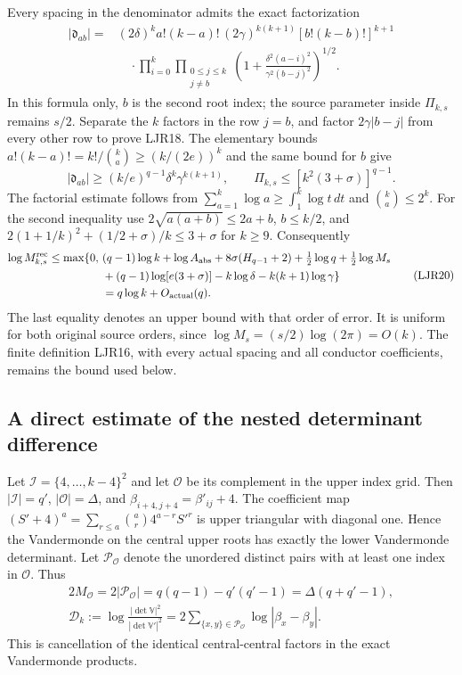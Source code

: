 \documentclass[11pt,a4paper]{article}
\begin{document}
Every spacing in the denominator admits the exact factorization
\[
 \begin{split}
 |\mathfrak d_{ab}|={}&
 (2\delta)^k a!(k-a)!\,
 (2\gamma)^{k(k+1)}[b!(k-b)!]^{k+1}\\
 &\quad\cdot
 \prod_{i=0}^k\prod_{\substack{0\le j\le k\\j\ne b}}
 \left(1+\frac{\delta^2(a-i)^2}{\gamma^2(b-j)^2}\right)^{1/2}.
 \end{split}\tag{LJR18}
\]
In this formula only, $b$ is the second root index; the source
parameter inside $\Pi_{k,s}$ remains $s/2$.
Separate the $k$ factors in the row $j=b$, and factor
$2\gamma|b-j|$ from every other row to prove LJR18.
The elementary bounds
$a!(k-a)!=k!/\binom ka\ge(k/(2e))^k$ and the same bound
for $b$ give
\[
 |\mathfrak d_{ab}|\ge(k/e)^{q-1}
                   \delta^k\gamma^{k(k+1)},\qquad
 \Pi_{k,s}\le[k^2(3+\sigma)]^{q-1}.
 \tag{LJR19}
\]
The factorial estimate follows from
$\sum_{a=1}^k\log a\ge\int_1^k\log t\,dt$ and
$\binom ka\le2^k$.
For the second inequality use
$2\sqrt{a(a+b)}\le2a+b$,
$b\le k/2$, and
$2(1+1/k)^2+(1/2+\sigma)/k\le3+\sigma$ for $k\ge9$.
Consequently
\[
 \begin{split}
 \log M_{k,s}^{\rm rec}\le
 \max\{0,\ &(q-1)\log k+\log A_{\rm abs}
 +8\sigma(H_{q-1}+2)+\tfrac12\log q+\tfrac12\log M_s\\
 &+(q-1)\log[e(3+\sigma)]-k\log\delta
                              -k(k+1)\log\gamma\}\\
 &=q\log k+O_{\rm actual}(q).
 \end{split}\tag{LJR20}
\]
The last equality denotes an upper bound with that order of
error. It is uniform for both original source orders, since
$\log M_s=(s/2)\log(2\pi)=O(k)$.
The finite definition LJR16, with every actual spacing and
all conductor coefficients, remains the bound used below.

\subsection{A direct estimate of the nested determinant difference}

Let $\mathcal I=\{4,\ldots,k-4\}^2$ and let $\mathcal O$ be
its complement in the upper index grid. Then
$|\mathcal I|=q'$, $|\mathcal O|=\Delta$, and
$\beta_{i+4,j+4}=\beta'_{ij}+4$.
The coefficient map
$(S'+4)^a=\sum_{r\le a}\binom ar4^{a-r}S'^r$
is upper triangular with diagonal one. Hence the Vandermonde
on the central upper roots has exactly the lower Vandermonde
determinant. Let $\mathcal P_{\mathcal O}$ denote the unordered
distinct pairs with at least one index in $\mathcal O$. Thus
\[
 \begin{gathered}
 2M_{\mathcal O}=2|\mathcal P_{\mathcal O}|
       =q(q-1)-q'(q'-1)=\Delta(q+q'-1),\\
 \mathscr D_k:=\log\frac{|\det\mathbb V|^2}{|\det\mathbb V'|^2}
       =2\sum_{\{x,y\}\in\mathcal P_{\mathcal O}}
                                      \log|\beta_x-\beta_y|.
 \end{gathered}\tag{LJR21}
\]
This is cancellation of the identical central-central factors
in the exact Vandermonde products.
\end{document}
